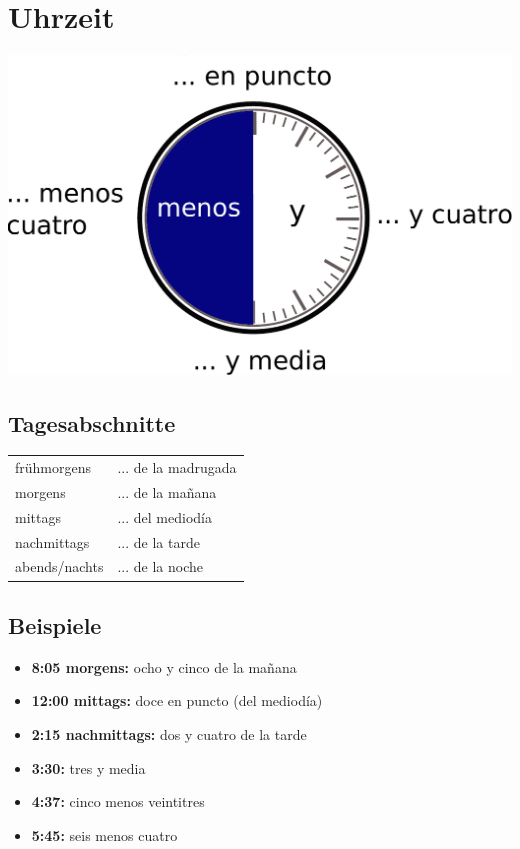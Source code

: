 \documentclass{spanish_summary}
\begin{document}
\section*{Uhrzeit}

\begin{center}
  \includegraphics[scale=0.5]{uhrzeit.pdf}
\end{center}

\subsection*{Tagesabschnitte}
\begin{longtable}{p{} p{}} 
  frühmorgens & ... de la madrugada \\
  morgens & ... de la ma\~{n}ana \\
  mittags & ... del mediodía \\
  nachmittags & ... de la tarde \\
  abends/nachts & ... de la noche
\end{longtable}

\newpage

\subsection*{Beispiele}
\begin{itemize}
  \item \textbf{8:05 morgens:} ocho y cinco de la ma\~{n}ana 
  \item \textbf{12:00 mittags:} doce en puncto (del mediodía)
  \item \textbf{2:15 nachmittags:} dos y cuatro de la tarde
  \item \textbf{3:30:} tres y media
  \item \textbf{4:37:} cinco menos veintitres
  \item \textbf{5:45:} seis menos cuatro
\end{itemize}
\end{document}
